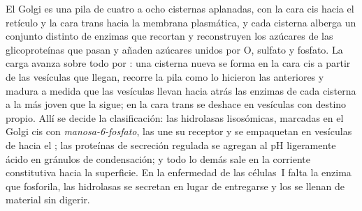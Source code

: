 \begin{proposition}[El Golgi]\label{prop:b3:membrane-traffic:golgi}
El Golgi es una pila de cuatro a ocho cisternas aplanadas, con la cara
cis hacia el retículo y la cara trans hacia la membrana plasmática, y
cada cisterna alberga un conjunto distinto de enzimas que recortan y
reconstruyen los azúcares de las glicoproteínas que pasan y añaden
azúcares unidos por O, sulfato y fosfato. La carga avanza sobre todo por
\emph{}: una cisterna nueva se forma en la cara cis a
partir de las vesículas que llegan, recorre la pila como lo hicieron las
anteriores y madura a medida que las vesículas  llevan hacia atrás
las enzimas de cada cisterna a la más joven que la sigue; en la cara
trans se deshace en vesículas con destino propio. Allí se decide la
clasificación: las hidrolasas lisosómicas, marcadas en el Golgi cis con
\emph{manosa-6-fosfato}, las une su receptor y se empaquetan en vesículas
de  hacia el ; las proteínas de secreción regulada se
agregan al pH ligeramente ácido en gránulos de condensación; y todo lo
demás sale en la corriente constitutiva hacia la superficie. En la
enfermedad de las células~I falta la enzima que fosforila, las hidrolasas
se secretan en lugar de entregarse y los  se llenan de material
sin digerir.
\end{proposition}

